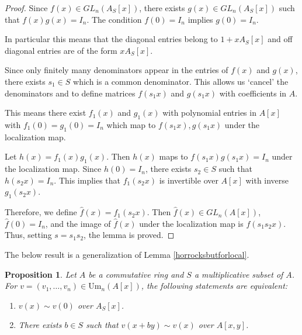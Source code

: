 \documentclass[12pt]{report}
\numberwithin{equation}{section}
\newcounter{dummy} \numberwithin{dummy}{section}
\newtheorem{proposition}[dummy]{Proposition}
\begin{document}
		\begin{proof}
			Since $f(x) \in GL_n(A_S[x])$, there exists $g(x) \in GL_n(A_S[x])$ such that $f(x)g(x) = I_n$. The condition $f(0) = I_n$ implies $g(0) = I_n$.
			
			In particular this means that the diagonal entries belong to $1 + xA_S[x]$ and off diagonal entries are of the form $x A_S[x]$.
			
			Since only finitely many denominators appear in the entries of $f(x)$ and $g(x)$, there exists $s_1 \in S$ which is a common denominator.  This allows us `cancel' the denominators and to define matrices $f(s_1 x)$ and $g(s_1 x)$ with coefficients in $A$. 
			
			This means there exist $f_1(x)$ and $g_1(x)$ with polynomial entries in $A[x]$ with $f_1(0) = g_1(0) = I_n$ which map to $f(s_1x), g(s_1x)$ under the localization map.
			
			Let $h(x) = f_1(x)g_1(x)$. Then $h(x)$ maps to $f(s_1x)g(s_1x) = I_n$ under the localization map. Since $h(0) = I_n$, there exists $s_2 \in S$ such that $h(s_2x) = I_n$.  This implies that $f_1(s_2x)$ is invertible over $A[x]$ with inverse $g_1(s_2x)$.
			
			Therefore, we define $\hat{f}(x) = f_1(s_2x)$.  Then $\hat{f}(x) \in GL_n(A[x])$, $\hat{f}(0) = I_n$, and the image of $\hat{f}(x)$ under the localization map is $f(s_1 s_2 x)$. Thus, setting $s = s_1 s_2$, the lemma is proved.
			\end{proof}
		
			The below result is a generalization of Lemma \ref{horrocksbutforlocal}.
	\begin{proposition}\label{generaliationoflocalhorrocks}
		Let $A$ be a commutative ring and $S$ a multiplicative subset of $A$. For $v = (v_1, \dots, v_n) \in \mathrm{Um}_n(A[x])$, the following statements are equivalent:
		\begin{enumerate}
			\item $v(x) \sim v(0)$ over $A_S[x]$.
			\item There exists $b \in S$ such that $v(x + by) \sim v(x)$ over $A[x, y]$.
		\end{enumerate}
	\end{proposition}
	
\end{document}
